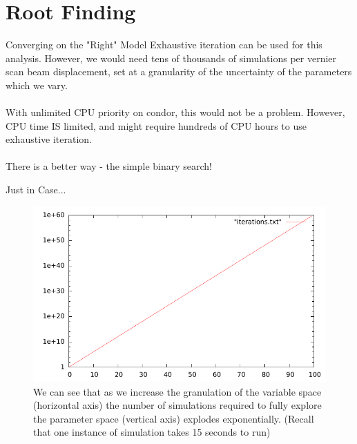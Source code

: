 \section{Root Finding}
\label{Root Finding}

\begin{frame}{Converging on the "Right" Model}
Exhaustive iteration can be used for this analysis. However, we would need tens
of thousands of simulations per vernier scan beam displacement, set at a
granularity of the uncertainty of the parameters which we vary. \\~\\
With unlimited CPU priority on condor, this would not be a problem. However,
CPU time IS limited, and might require hundreds of CPU hours to use exhaustive
iteration.\\~\\
There is a better way - the simple binary search!
\end{frame}

\begin{frame}{Just in Case...}
\begin{figure}
\begin{center}
\includegraphics[width=0.7\linewidth]{../RootFinding/figs/iterations.pdf}
\end{center}
\caption{We can see that as we increase the granulation of the variable space
(horizontal axis) the number of simulations required to fully explore the
parameter space (vertical axis) explodes exponentially. (Recall that one
instance of simulation takes
15 seconds to run)}
\label{fig:iterations}
\end{figure}
\end{frame}


